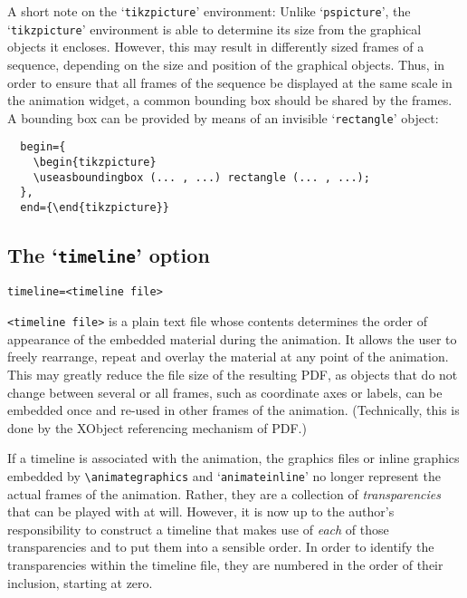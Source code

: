 \documentclass[a4paper]{article}
\begin{document}
A short note on the `\verb+tikzpicture+' environment: Unlike `\verb+pspicture+', the `{\tt tikz\-pic\-ture}' environment is able to determine its size from the graphical objects it encloses. However, this may result in differently sized frames of a sequence, depending on the size and position of the graphical objects. Thus, in order to ensure that all frames of the sequence be displayed at the same scale in the animation widget, a common bounding box should be shared by the frames. A bounding box can be provided by means of an invisible `\verb+rectangle+' object:
\begin{verbatim}
  begin={
    \begin{tikzpicture}
    \useasboundingbox (... , ...) rectangle (... , ...);
  },
  end={\end{tikzpicture}}
\end{verbatim}

\subsection{The `{\tt timeline}' option}\label{sect:timeline}
\begin{verbatim}
timeline=<timeline file>
\end{verbatim}
\verb+<timeline file>+ is a plain text file whose contents determines the order of appearance of the embedded material during the animation. It allows the user to freely rearrange, repeat and overlay the material at any point of the animation. This may greatly reduce the file size of the resulting PDF, as objects that do not change between several or all frames, such as coordinate axes or labels, can be embedded once and re-used in other frames of the animation. (Technically, this is done by the XObject referencing mechanism of PDF.)

If a timeline is associated with the animation, the graphics files or inline graphics embedded by \verb+\animategraphics+ and `\verb+animateinline+' no longer represent the actual frames of the animation. Rather, they are a collection of \emph{transparencies} that can be played with at will. However, it is now up to the author's responsibility to construct a timeline that makes use of \emph{each} of those transparencies and to put them into a sensible order. In order to identify the transparencies within the timeline file, they are numbered in the order of their inclusion, starting at zero.
\end{document}
